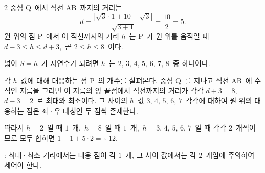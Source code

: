 \documentclass[10pt,fleqn]{article}
\begin{document}
\begin{multicols*}{2}
중심 $\mathrm{Q}$\ 에서 직선 $\mathrm{AB}$\ 까지의 거리는
\[ d = \dfrac{|\sqrt{3} \cdot 1 + 10 - \sqrt{3}|}{\sqrt{3 + 1}} = \dfrac{10}{2} = 5. \]
원 위의 점 $\mathrm{P}$\ 에서 이 직선까지의 거리 $h$\ 는 $\mathrm{P}$\ 가 원 위를 움직일 때 $d - 3 \le h \le d + 3$,\ 곧 $2 \le h \le 8$\ 이다.

넓이 $S = h$\ 가 자연수가 되려면 $h$\ 는 $2,\,3,\,4,\,5,\,6,\,7,\,8$\ 중 하나이다.

각 $h$\ 값에 대해 대응하는 점 $\mathrm{P}$\ 의 개수를 살펴본다. 중심 $\mathrm{Q}$\ 를 지나고 직선 $\mathrm{AB}$\ 에 수직인 지름을 그리면 이 지름의 양 끝점에서 직선까지의 거리가 각각 $d + 3 = 8$,\ $d - 3 = 2$\ 로 최대와 최소이다. 그 사이의 $h$\ 값 $3,\,4,\,5,\,6,\,7$\ 각각에 대하여 원 위의 대응하는 점은 좌·우 대칭인 두 점씩 존재한다.

따라서 $h = 2$\ 일 때 $1$\ 개,\ $h = 8$\ 일 때 $1$\ 개,\ $h = 3,\,4,\,5,\,6,\,7$\ 일 때 각각 $2$\ 개씩이므로 모두 합하면 $1 + 1 + 5 \cdot 2 = \therefore\ 12$.

\begin{dmcriticalpoint}
: 최대·최소 거리에서는 대응 점이 각 $1$\ 개, 그 사이 값에서는 각 $2$\ 개임에 주의하여 세어야 한다.
\end{dmcriticalpoint}

\end{multicols*}
\end{document}
